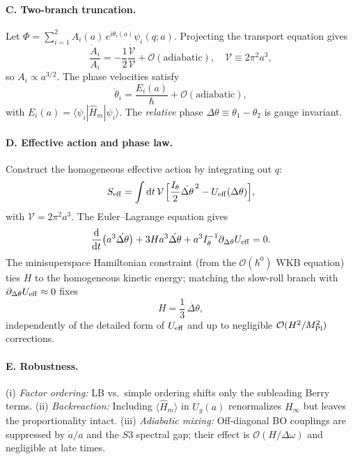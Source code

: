 \documentclass[twocolumn,aps,prd,showpacs,nofootinbib,superscriptaddress]{revtex4-2}
\def\Sthree{S3}%
\newcommand{\Sthree}{S^{3}}
\newcommand{\dd}{\mathrm{d}}
\begin{document}
\paragraph*{C. Two-branch truncation.}
Let $\Phi=\sum_{i=1}^2 A_i(a)\,e^{i\theta_i(a)}\psi_i(q;a)$. Projecting the transport equation gives
\begin{equation}
\frac{\dot{A}_i}{A_i}=-\frac{1}{2}\frac{\dot{\mathcal{V}}}{\mathcal{V}}+\mathcal{O}(\mathrm{adiabatic}),
\quad \mathcal{V}\equiv 2\pi^2 a^3,
\end{equation}
so $A_i\propto a^{3/2}$. The phase velocities satisfy
\begin{equation}
\dot{\theta}_i=\frac{E_i(a)}{\hbar}+\mathcal{O}(\mathrm{adiabatic}),
\end{equation}
with $E_i(a)=\langle\psi_i|\hat{H}_m|\psi_i\rangle$. The \emph{relative} phase $\Delta\theta\equiv\theta_1-\theta_2$ is gauge invariant.

\paragraph*{D. Effective action and phase law.}
Construct the homogeneous effective action by integrating out $q$:
\begin{equation}
S_{\rm eff}=\int \dd t\,\mathcal{V}\,\Big[\frac{I_\theta}{2}\dot{\Delta\theta}^{\,2}-U_{\rm eff}(\Delta\theta)\Big],
\end{equation}
with $\mathcal{V}=2\pi^2 a^3$. The Euler--Lagrange equation gives
\begin{equation}
\frac{\dd}{\dd t}\big(a^3 \dot{\Delta\theta}\big)+3Ha^3 \dot{\Delta\theta}+a^3 I_\theta^{-1}\partial_{\Delta\theta}U_{\rm eff}=0.
\end{equation}
The minisuperspace Hamiltonian constraint (from the $\mathcal{O}(\hbar^0)$ WKB equation) ties $H$ to the homogeneous kinetic energy; matching the slow-roll branch with $\partial_{\Delta\theta}U_{\rm eff}\approx 0$ fixes
\begin{equation}
H=\frac{1}{3}\,\dot{\Delta\theta},
\end{equation}
independently of the detailed form of $U_{\rm eff}$ and up to negligible $\mathcal{O}(H^2/M_{\rm Pl}^2)$ corrections.

\paragraph*{E. Robustness.}
(i) \emph{Factor ordering:} LB vs.\ simple ordering shifts only the subleading Berry terms. (ii) \emph{Backreaction:} Including $\langle\hat{H}_m\rangle$ in $U_g(a)$ renormalizes $H_\infty$ but leaves the proportionality intact. (iii) \emph{Adiabatic mixing:} Off-diagonal BO couplings are suppressed by $\dot{a}/a$ and the $\Sthree$ spectral gap; their effect is $\mathcal{O}(H/\Delta\omega)$ and negligible at late times.
\end{document}
